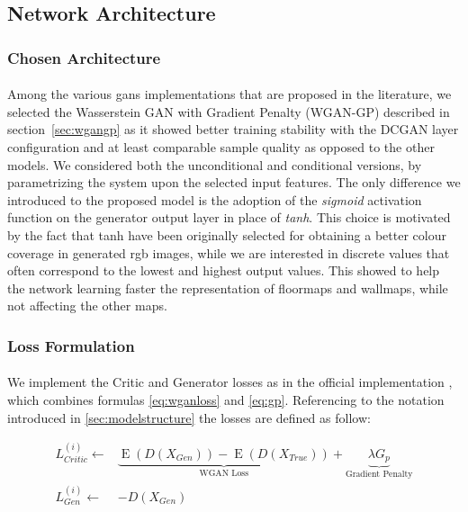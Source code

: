 \subsection{Network Architecture}
\label{sec:networkarch}

\subsubsection{Chosen Architecture} 
\paragraph{} Among the various \glspl{gan} implementations that are proposed in the literature, we selected the Wasserstein GAN with Gradient Penalty \cite{wgangp} (WGAN-GP) described in section~\ref{sec:wgangp} as it showed better training stability with the DCGAN layer configuration and at least comparable sample quality as opposed to the other models. We considered both the unconditional and conditional versions, by parametrizing the system upon the selected input features. The only difference we introduced to the proposed model is the adoption of the \textit{sigmoid} activation function on the generator output layer in place of \textit{tanh}. This choice is motivated by the fact that tanh have been originally selected for obtaining a better colour coverage in generated rgb images, while we are interested in discrete values that often correspond to the lowest and highest output values. This showed to help the network learning faster the representation of \glspl{floormap} and \glspl{wallmap}, while not affecting the other maps.


\subsubsection{Loss Formulation}
\paragraph{} We implement the Critic and Generator losses as in the  official implementation \cite{wgangp-imple}, which combines formulas \ref{eq:wganloss} and \ref{eq:gp}. Referencing to the notation introduced in \ref{sec:modelstructure} the losses are defined as follow:

\begin{equation}
\label{eq:loss}
\begin{split}
L_{Critic}^{(i)} \gets & \underbrace{\operatorname{E}(D(X_{Gen})) - \operatorname{E}(D(X_{True}))}_{\text{WGAN Loss}} + \underbrace {\lambda G_p}_{\text{Gradient Penalty}} \\
L_{Gen}^{(i)} \gets & -D(X_{Gen}) 
\end{split}
\end{equation}

